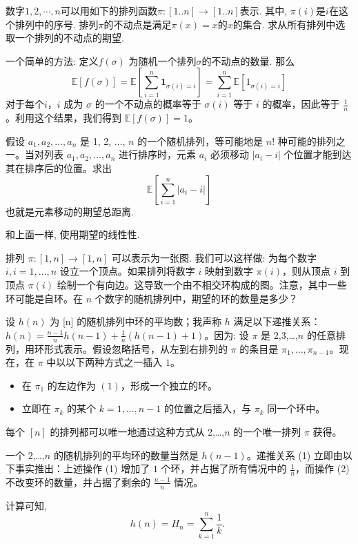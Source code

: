 \begin{exercise}
     数字$1,2,\cdots, n$可以用如下的排列函数$\pi:[1..n] \to [1..n]$表示. 其中, $\pi(i)$是$i$在这个排列中的序号. 排列$\pi$的不动点是满足$\pi(x)=x$的$x$的集合. 求从所有排列中选取一个排列的不动点的期望. 
\end{exercise}

\begin{solution*}
    一个简单的方法: 定义$f(\sigma)$ 为随机一个排列$\sigma$的不动点的数量. 
    那么$$
    \mathbb{E}[{f}(\sigma)]=\mathbb{E}\left[\sum_{{i}=1}^{{n}} \mathbf{1}_{\sigma({i})={i}}\right]=\sum_{{i}=1}^{{n}} \mathbb{E}\left[1_{\sigma({i})={i}}\right]
    $$
    对于每个$i$，$i$ 成为 $\sigma$ 的一个不动点的概率等于 $\sigma(i)$ 等于 $i$ 的概率，因此等于 $\frac{1}{n}$。利用这个结果，我们得到 $\mathbb{E}[f(\sigma)]=1$。
\end{solution*}

\begin{exercise}
    假设 $a_1, a_2, \dots, a_n$ 是 {1, 2, $\dots$, $n$} 的一个随机排列，等可能地是 $n!$ 种可能的排列之一。当对列表 $a_1, a_2, \dots, a_n$ 进行排序时，元素 $a_i$ 必须移动 $|a_i - i|$ 个位置才能到达其在排序后的位置。求出$$
    \mathbb{E}\left[\sum_{i=1}^n\left|a_i-i\right|\right]
    $$
    也就是元素移动的期望总距离. 
\end{exercise}

\begin{solution*}
    和上面一样, 使用期望的线性性. 
\end{solution*}

\begin{exercise}
    排列 $\pi: [1, n] \rightarrow [1, n]$ 可以表示为一张图. 我们可以这样做: 为每个数字 $i, i = 1, \dots, n$ 设立一个顶点。如果排列将数字 $i$ 映射到数字 $\pi(i)$，则从顶点 $i$ 到顶点 $\pi(i)$ 绘制一个有向边。这导致一个由不相交环构成的图。注意，其中一些环可能是自环。在 $n$ 个数字的随机排列中，期望的环的数量是多少？
\end{exercise}

\begin{solution*}
    设 $h(n)$ 为 [n] 的随机排列中环的平均数；我声称 $h$ 满足以下递推关系：$h(n)=\frac{n-1}{n}h(n-1)+\frac{1}{n}(h(n-1)+1)$。因为:
    设 $\pi$ 是 {2,3,…,$n$} 的任意排列，用环形式表示。假设忽略括号，从左到右排列的 $\pi$ 的条目是 $\pi_1,\dots,\pi_{n-1}$。现在，在 $\pi$ 中以以下两种方式之一插入 $1$。
    \begin{itemize}
        \item 在 $\pi_1$ 的左边作为 $(1)$，形成一个独立的环。
        \item 立即在 $\pi_k$ 的某个 $k=1,\dots,n-1$ 的位置之后插入，与 $\pi_k$ 同一个环中。
    \end{itemize}
    每个 $[n]$ 的排列都可以唯一地通过这种方式从 {2,…,$n$} 的一个唯一排列 $\pi$ 获得。

一个 {2,…,$n$} 的随机排列的平均环的数量当然是 $h(n-1)$。递推关系 (1) 立即由以下事实推出：上述操作 (1) 增加了 $1$ 个环，并占据了所有情况中的 $\frac{1}{n}$，而操作 (2) 不改变环的数量，并占据了剩余的 $\frac{n-1}{n}$ 情况。

计算可知, 
$$
h(n)=H_n=\sum_{k=1}^n \frac{1}{k} \text {. }
$$
\end{solution*}